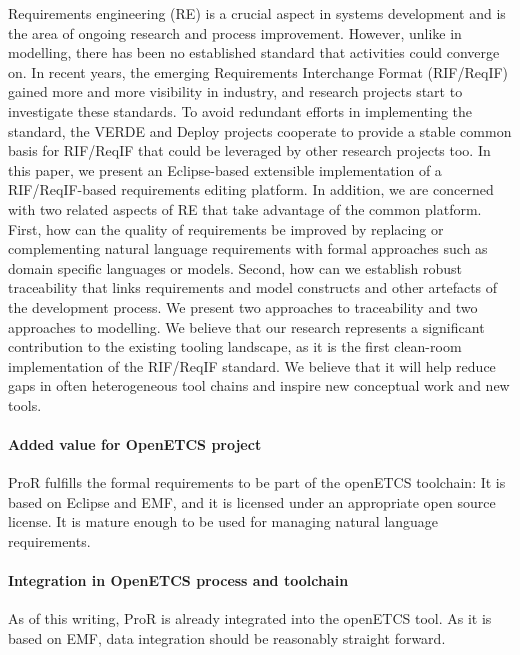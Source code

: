 \begin{description}
Requirements engineering (RE) is a crucial aspect in systems development and is the area of ongoing research and process improvement. However, unlike in modelling, there has been no established standard that activities could converge on.
In recent years, the emerging Requirements Interchange Format (RIF/ReqIF) gained more and more visibility in industry, and research projects start to investigate these standards. To avoid redundant efforts in implementing the standard, the VERDE and Deploy projects cooperate to provide a stable common basis for RIF/ReqIF that could be leveraged by other research projects too. In this paper, we present an Eclipse-based extensible implementation of a RIF/ReqIF-based requirements editing platform.
In addition, we are concerned with two related aspects of RE that take advantage of the common platform. First, how can the quality of requirements be improved by replacing or complementing natural language requirements with formal approaches such as domain specific languages or models. Second, how can we establish robust traceability that links requirements and model constructs and other artefacts of the development process. We present two approaches to traceability and two approaches to modelling.
We believe that our research represents a significant contribution to the existing tooling landscape, as it is the first clean-room implementation of the RIF/ReqIF standard. We believe that it will help reduce gaps in often heterogeneous tool chains and inspire new conceptual work and new tools.

\end{description}

\paragraph{Added value for OpenETCS project}

ProR fulfills the formal requirements to be part of the openETCS toolchain: It is based on Eclipse and EMF, and it is licensed under an appropriate open source license.  It is mature enough to be used for managing natural language requirements.

\paragraph{Integration in OpenETCS process and toolchain}

As of this writing, ProR is already integrated into the openETCS tool.  As it is based on EMF, data integration should be reasonably straight forward.


